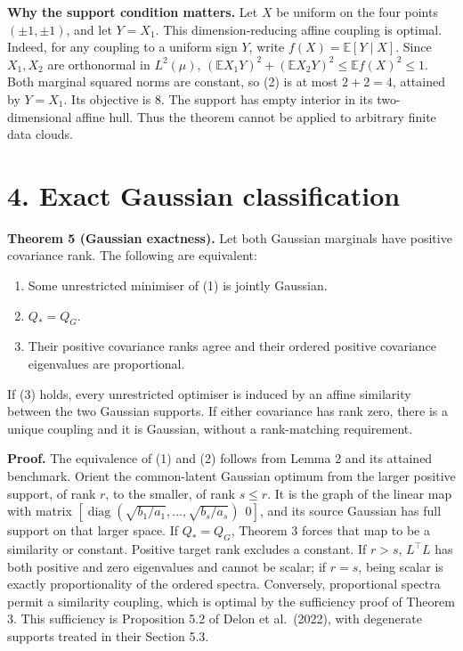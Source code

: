 \documentclass[
  british,
  11pt,
  a4paper,
]{article}
\providecommand{\tightlist}{%
  \setlength{\itemsep}{0pt}\setlength{\parskip}{0pt}}
\begin{document}
\textbf{Why the support condition matters.} Let \(X\) be uniform on the
four points \((\pm1,\pm1)\), and let \(Y=X_1\). This dimension-reducing
affine coupling is optimal. Indeed, for any coupling to a uniform sign
\(Y\), write \(f(X)=\mathbb E[Y\mid X]\). Since \(X_1,X_2\) are
orthonormal in \(L^2(\mu)\),
\((\mathbb E X_1Y)^2+(\mathbb E X_2Y)^2\leq\mathbb E f(X)^2\leq1\). Both
marginal squared norms are constant, so (2) is at most \(2+2=4\),
attained by \(Y=X_1\). Its objective is \(8\). The support has empty
interior in its two-dimensional affine hull. Thus the theorem cannot be
applied to arbitrary finite data clouds.

\section{4. Exact Gaussian
classification}\label{exact-gaussian-classification}

\textbf{Theorem 5 (Gaussian exactness).} Let both Gaussian marginals
have positive covariance rank. The following are equivalent:

\begin{enumerate}
\def\labelenumi{\arabic{enumi}.}
\tightlist
\item
  Some unrestricted minimiser of (1) is jointly Gaussian.
\item
  \(Q_*=Q_G\).
\item
  Their positive covariance ranks agree and their ordered positive
  covariance eigenvalues are proportional.
\end{enumerate}

If (3) holds, every unrestricted optimiser is induced by an affine
similarity between the two Gaussian supports. If either covariance has
rank zero, there is a unique coupling and it is Gaussian, without a
rank-matching requirement.

\textbf{Proof.} The equivalence of (1) and (2) follows from Lemma 2 and
its attained benchmark. Orient the common-latent Gaussian optimum from
the larger positive support, of rank \(r\), to the smaller, of rank
\(s\leq r\). It is the graph of the linear map with matrix
\([\operatorname{diag}(\sqrt{b_1/a_1},\ldots,\sqrt{b_s/a_s})\ \ 0]\),
and its source Gaussian has full support on that larger space. If
\(Q_*=Q_G\), Theorem 3 forces that map to be a similarity or constant.
Positive target rank excludes a constant. If \(r>s\), \(L^\top L\) has
both positive and zero eigenvalues and cannot be scalar; if \(r=s\),
being scalar is exactly proportionality of the ordered spectra.
Conversely, proportional spectra permit a similarity coupling, which is
optimal by the sufficiency proof of Theorem 3. This sufficiency is
Proposition 5.2 of Delon et al.~(2022), with degenerate supports treated
in their Section 5.3.
\end{document}
